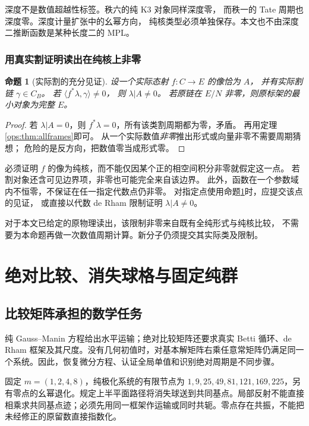 \documentclass[11pt,a4paper,oneside]{ctexart}
\theoremstyle{cnplain}
\newtheorem{proposition}[theorem]{命题}
\theoremstyle{definition}
\theoremstyle{remark}
\numberwithin{equation}{section}
\begin{document}
深度不是数值超越性标签。秩六的纯 K3 对象同样深度零，
而秩一的 Tate 周期也深度零。深度计量扩张中的幺幂方向，
纯核类型必须单独保存。本文也不由深度二推断函数是某种长度二的 MPL。

\subsubsection{用真实割证明读出在纯核上非零}
\begin{proposition}[实际割的充分见证]\label{ops:prop:cutwitness}
设一个实际态射 $f:C\to E$ 的像恰为 $A$，
并有实际割链 $\gamma\in C_B$。
若 $\langle f^*\lambda,\gamma\rangle\ne0$，
则 $\lambda|A\ne0$。
若原链在 $E/N$ 非零，则原标架的最小对象为完整 $E$。
\end{proposition}
\begin{proof}
若 $\lambda|A=0$，则 $f^*\lambda=0$，所有该类割周期都为零，矛盾。
再用定理\ref{ops:thm:allframes}即可。
从一个实际数值\emph{非零}推出形式或向量非零不需要周期猜想；
危险的是反方向，把数值零当成形式零。
\end{proof}

必须证明 $f$ 的像为纯核，而不能仅因某个正的相空间积分非零就假定这一点。
若割对象还含可见边界项，非零也可能完全来自该边界。
此外，函数在一个参数域内不恒零，不保证在任一指定代数点仍非零。
对指定点使用命题\ref{ops:prop:cutwitness}时，应提交该点的见证，
或直接以代数 de Rham 限制证明 $\lambda|A\ne0$。

对于本文已给定的原物理读出，该限制非零来自既有全纯形式与纯核比较，
不需要为本命题再做一次数值周期计算。新分子仍须提交其实际类及限制。


\endgroup

\section{绝对比较、消失球格与固定纯群}\label{ch:comparison}\label{ch:lattice}\label{ch:fixed}\label{ch:coaction}

\begingroup


\subsection{比较矩阵承担的数学任务}
纯 Gauss--Manin 方程给出水平运输；绝对比较矩阵还要求真实 Betti 循环、de Rham 框架及其尺度。没有几何初值时，对基本解矩阵右乘任意常矩阵仍满足同一个系统。因此，恢复微分方程、认证全局单值和识别绝对周期是不同步骤。

固定 $m=(1,2,4,8)$，纯极化系统的有限节点为 $1,9,25,49,81,121,169,225$，另有零点的幺幂退化。规定上半平面路径将消失球送到共同基点。局部反射不能直接相乘求共同基点迹；必须先用同一框架作运输或同时共轭。零点存在共振，不能把未经修正的原留数直接指数化。
\end{document}
